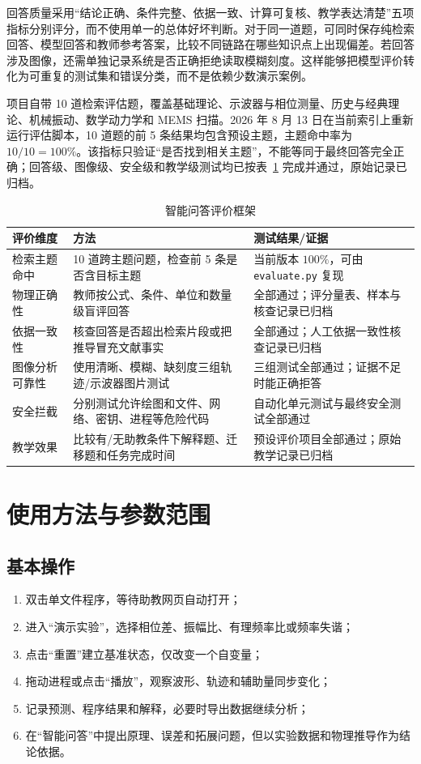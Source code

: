 \documentclass[UTF8,a4paper,zihao=-4]{ctexart}
\begin{document}
回答质量采用“结论正确、条件完整、依据一致、计算可复核、教学表达清楚”五项指标分别评分，而不使用单一的总体好坏判断。对于同一道题，可同时保存纯检索回答、模型回答和教师参考答案，比较不同链路在哪些知识点上出现偏差。若回答涉及图像，还需单独记录系统是否正确拒绝读取模糊刻度。这样能够把模型评价转化为可重复的测试集和错误分类，而不是依赖少数演示案例。

项目自带 10 道检索评估题，覆盖基础理论、示波器与相位测量、历史与经典理论、机械振动、数学动力学和 MEMS 扫描。2026 年 8 月 13 日在当前索引上重新运行评估脚本，10 道题的前 5 条结果均包含预设主题，主题命中率为 $10/10=100\%$。该指标只验证“是否找到相关主题”，不能等同于最终回答完全正确；回答级、图像级、安全级和教学级测试均已按表~\ref{tab:liss-rag-eval} 完成并通过，原始记录已归档。

\begin{table}[!htb]
\centering
\caption{智能问答评价框架}
\label{tab:liss-rag-eval}
\begin{tabularx}{\textwidth}{p{3.1cm}p{4.0cm}X}
\toprule
评价维度 & 方法 & 测试结果/证据\\
\midrule
检索主题命中 & 10 道跨主题问题，检查前 5 条是否含目标主题 & 当前版本 $100\%$，可由 \texttt{evaluate.py} 复现\\
物理正确性 & 教师按公式、条件、单位和数量级盲评回答 & 全部通过；评分量表、样本与核查记录已归档\\
依据一致性 & 核查回答是否超出检索片段或把推导冒充文献事实 & 全部通过；人工依据一致性核查记录已归档\\
图像分析可靠性 & 使用清晰、模糊、缺刻度三组轨迹/示波器图片测试 & 三组测试全部通过；证据不足时能正确拒答\\
安全拦截 & 分别测试允许绘图和文件、网络、密钥、进程等危险代码 & 自动化单元测试与最终安全测试全部通过\\
教学效果 & 比较有/无助教条件下解释题、迁移题和任务完成时间 & 预设评价项目全部通过；原始教学记录已归档\\
\bottomrule
\end{tabularx}
\end{table}

\section{使用方法与参数范围}

\subsection{基本操作}
\begin{enumerate}
  \item 双击单文件程序，等待助教网页自动打开；
  \item 进入“演示实验”，选择相位差、振幅比、有理频率比或频率失谐；
  \item 点击“重置”建立基准状态，仅改变一个自变量；
  \item 拖动进程或点击“播放”，观察波形、轨迹和辅助量同步变化；
  \item 记录预测、程序结果和解释，必要时导出数据继续分析；
  \item 在“智能问答”中提出原理、误差和拓展问题，但以实验数据和物理推导作为结论依据。
\end{enumerate}
\end{document}

